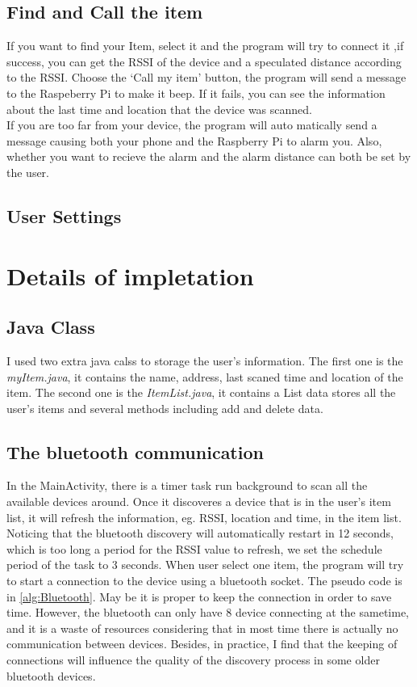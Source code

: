 \documentclass{article}
\begin{document}
\subsection{Find and Call the item}
If you want to find your Item, select it and the program will try to connect it ,if success, you can get the RSSI of the device and a speculated distance according to the RSSI. Choose the `Call my item' button, the program will send a message to the Raspeberry Pi to make it beep. If it fails, you can see the information about the last time and location that the device was scanned. \\
If you are too far from your device, the program will auto matically send a message causing both your phone and the Raspberry Pi  to alarm you. Also, whether you want to recieve the alarm and the alarm distance can both be set by the user.
\subsection{User Settings}

\section{Details of impletation}
\subsection{Java Class}
I used two extra java calss to storage the user's information. The first one is the \emph{myItem.java}, it contains the name, address, last scaned time and location of the item. The second one is the \emph{ItemList.java}, it contains a List data stores all the user's items and several methods including add and delete data.
\subsection{The bluetooth communication}
In the MainActivity, there is a timer task run background to scan all the available devices around. Once it discoveres a device that is in the user's item list, it will refresh the information, eg. RSSI, location and time, in the item list. Noticing that the bluetooth discovery will automatically restart in 12 seconds, which is too long a period for the RSSI value to refresh, we set the schedule period of the task to 3 seconds. When user select one item, the program will try to start a connection to the device using a bluetooth socket. The pseudo code is in \ref{alg:Bluetooth}.
May be it is proper to keep the connection in order to save time. However, the bluetooth can only have 8 device connecting at the sametime, and it is a waste of resources considering that in most time there is actually no communication between devices. Besides, in practice, I find that the keeping of connections will influence the quality of the discovery process in some older bluetooth devices. 
\end{document}
